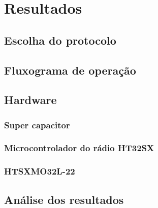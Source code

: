 %

\chapter{Resultados}


\section{Escolha do protocolo}


\section{Fluxograma de operação}


\section{Hardware}


\subsection{Super capacitor}\label{sec:supercap}


\subsection{Microcontrolador do rádio HT32SX}\label{sc:HT32SX}


\subsection{HTSXMO32L-22}


\section{Análise dos resultados}




